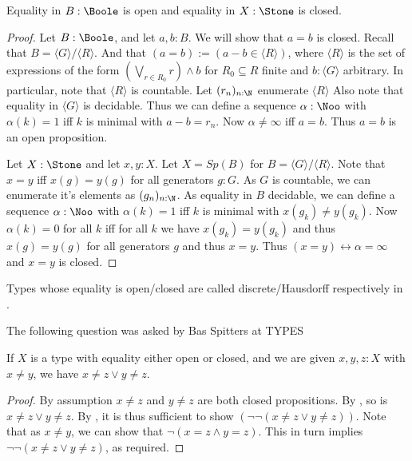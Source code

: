 \begin{lemma}\label{EqualityBooleStoneClosedOpen}
  Equality in $B:\Boole$ is open and equality in $X:\Stone$ is closed. 
\end{lemma}
\begin{proof}
  Let $B:\Boole$, and let $a,b:B$. We will show that $a=b$ is closed. 
  Recall that $B = \langle G \rangle / \langle R \rangle$. 
  And that $(a=b):= (a-b \in \langle R \rangle)$, 
  where $\langle R \rangle$ is the set of expressions of the form
  $(\bigvee_{r\in R_0} r) \wedge b$ for $R_0\subseteq R$ finite and $b:\langle G \rangle$ 
  arbitrary. 
  In particular, note that $\langle R \rangle$ is countable. 
  Let $(r_n)_{n:\N}$ enumerate $ \langle R \rangle $
  Also note that equality in $\langle G \rangle$ is decidable. 
  Thus we can define a sequence $\alpha:\Noo$ with $\alpha(k) = 1$ 
  iff $k$ is minimal with $a -b = r_n$. 
  Now $\alpha \neq \infty $ iff $a = b$. Thus $a=b$ is an open proposition. 

  Let $X:\Stone$ and let $x,y:X$. 
  Let $X= Sp(B)$ for $B = \langle G \rangle / \langle R \rangle $. 
  Note that $x=y$ iff $x(g) = y(g)$ for all generators $g:G$. 
  As $G$ is countable, we can enumerate it's elements as $(g_n)_{n:\N}$. 
  As equality in $B$ decidable, we can define a sequence $\alpha:\Noo$ 
  with $\alpha(k) = 1$ iff $k$ is minimal with $x(g_k) \neq y(g_k)$. 
  Now $\alpha(k) = 0$ for all $k$ iff for all $k$ we have $x(g_k) = y(g_k)$ and thus $x(g) = y(g)$ for all generators $g$ 
  and thus $ x= y$. 
  Thus $(x=y) \leftrightarrow \alpha= \infty$ and $ x=y$ is closed. 
\end{proof}
Types whose equality is open/closed are called discrete/Hausdorff respectively in \cite{SyntheticTopologyLesnik}.

The following question was asked by Bas Spitters at TYPES
\begin{lemma}[Apartness]
  If $X$ is a type with equality either open or closed, and we are given $x,y,z:X$ with $x \neq y$, we have 
  $x\neq z \vee y \neq z$.  
\end{lemma}
\begin{proof}
  By assumption $x\neq z$ and $ y \neq z$ are both closed propositions. 
  By , so is $x \neq z \vee y \neq z$. 
  By , it is thus sufficient to show 
  $(\neg \neg (x \neq z \vee y \neq z))$.
  Note that as $x\neq y$, we can show that $\neg ( x = z \wedge y = z)$. 
  This in turn implies $\neg \neg ( x \neq  z \vee y \neq  z)$, as required. 
\end{proof}

